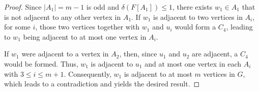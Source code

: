 \documentclass[10pt,a4paper]{amsart}
\begin{document}
\begin{proof}
Since $|A_1|=m-1$ is odd and $\delta(F[A_1])\le 1$, there exists $w_1\in A_1$ that is not adjacent to any other vertex in $A_1$. If $w_1$ is adjacent to two vertices in $A_i$, for some $i$, those two vertices  together with $w_1$ and $u_i$ would form a $C_4$, leading to $w_1$ being adjacent to at most one vertex in $A_i$.

If $w_1$ were adjacent to a vertex in $A_2$, then, since $u_1$ and $u_2$ are adjacent, a $C_4$ would be formed. Thus, $w_1$ is adjacent to $u_1$ and at most one vertex in each $A_i$ with $3\le i\le m+1$. Consequently, $w_1$ is adjacent to at most $m$ vertices in $G$, which leads to a contradiction and yields the desired result.
\end{proof}
\end{document}
